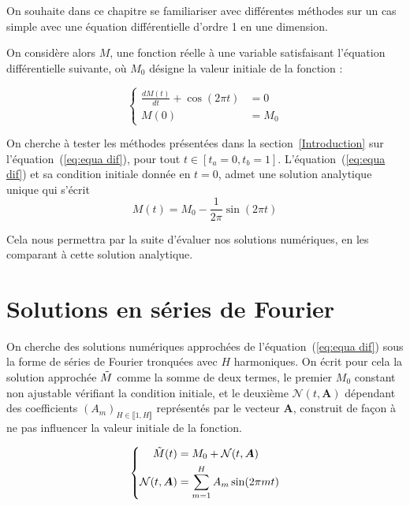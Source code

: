 \documentclass[12pt]{report}
\begin{document}
On souhaite dans ce chapitre se familiariser avec différentes méthodes sur un cas simple avec une équation différentielle d'ordre 1 en une dimension.

On considère alors $M$, une fonction réelle à une variable satisfaisant l'équation différentielle suivante, où $M_0$ désigne la valeur initiale de la fonction :

\begin{equation}
\left\{
    \begin{aligned}
        \frac{dM(t)}{dt} + \cos(2\pi t) &= 0 \\
        M(0) &= M_0
    \end{aligned}
\right.
\label{eq:equa dif}
\end{equation}

On cherche à tester les méthodes présentées dans la section~\ref{Introduction} sur l'équation~(\ref{eq:equa dif}), pour tout $t\in [t_a=0,t_b=1]$.
L'équation~(\ref{eq:equa dif}) et sa condition initiale donnée en $t=0$, admet une solution analytique unique qui s'écrit
\begin{equation}
    {M}(t) = M_0 - \frac{1}{2\pi}\sin(2\pi t)
    \label{eq:solution analytique}
\end{equation}


Cela nous permettra par la suite d'évaluer nos solutions numériques, en les comparant à cette solution analytique.


\section{Solutions en séries de Fourier}

On cherche des solutions numériques approchées de l'équation~(\ref{eq:equa dif}) sous la forme de séries de Fourier tronquées avec $H$ harmoniques.
On écrit pour cela la solution approchée $\Tilde{M}$ comme la somme de deux termes, le premier $M_0$ constant non ajustable vérifiant la condition initiale, et le deuxième $\mathcal{N}(t,\bm{A})$ dépendant des coefficients $(A_m)_{H\in \llbracket 1,H \rrbracket}$ représentés par le vecteur $\bm{A}$, construit de façon à ne pas influencer la valeur initiale de la fonction.

\begin{equation}
\left\{
    \begin{aligned}
        \Tilde{M}(t) &= M_0 + {\mathcal{N}}(t,\bm{A}) \\
        {\mathcal{N}}(t,\bm{A}) &= \sum_{m=1}^{H} A_m \sin(2\pi m t) 
    \end{aligned}
\right.
\label{eq:solution Fourier}
\end{equation}
\end{document}
